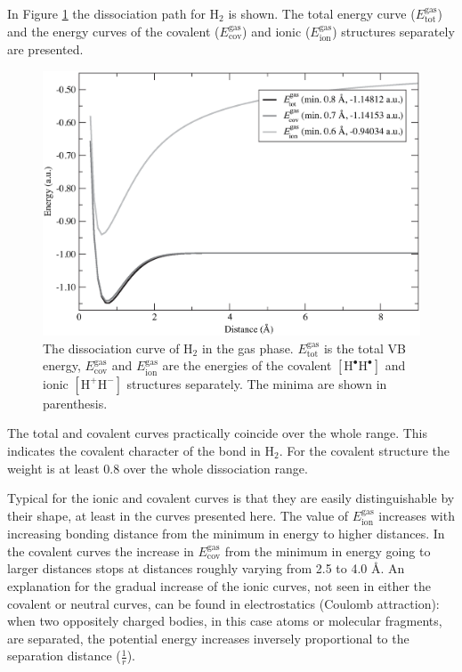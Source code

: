 In Figure \ref{ch3.fig.h2_c} the dissociation path for H$_2$ is shown. The total energy curve ($E_\mathrm{tot}^\mathrm{gas}$) and the energy curves of the covalent ($E_\mathrm{cov}^\mathrm{gas}$) and ionic ($E_\mathrm{ion}^\mathrm{gas}$) structures separately are presented. 
\begin{figure}[htbp]
\begin{center}
\includegraphics[scale=0.6]{dissociation/figures/h2_g.eps}
\end{center}
\caption{The dissociation curve of H$_2$ in the gas phase. $E_\mathrm{tot}^\mathrm{gas}$ is the total VB energy, $E_\mathrm{cov}^\mathrm{gas}$  and $E_\mathrm{ion}^\mathrm{gas}$ are the energies of the covalent $[\mathrm{H^\bullet H^\bullet}]$ and ionic $[\mathrm{H^{+}H^{-}}]$ structures separately. The minima are shown in parenthesis.}
\label{ch3.fig.h2_c}
\end{figure}
The total and covalent curves practically coincide over the whole range. This indicates the covalent character of the bond in H$_2$. For the covalent structure the weight is at least 0.8 over the whole dissociation range.

Typical for the ionic and covalent curves is that they are easily distinguishable by their shape, at least in the curves presented here. The value of $E_\mathrm{ion}^\mathrm{gas}$ increases with increasing bonding distance from the minimum in energy to higher distances. In the covalent curves the increase in $E_\mathrm{cov}^\mathrm{gas}$ from the minimum in energy going to larger distances stops at distances roughly varying from 2.5 to 4.0 \AA. An explanation for the gradual increase of the ionic curves, not seen in either the covalent or neutral curves, can be found in electrostatics (Coulomb attraction): when two oppositely charged bodies, in this case atoms or molecular fragments, are separated, the potential energy increases inversely proportional to the separation distance ($\frac{1}{r}$).

